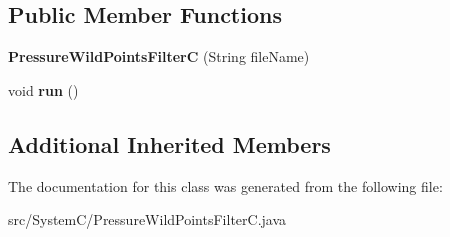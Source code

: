 \subsection*{Public Member Functions}
\begin{DoxyCompactItemize}
\item 
\hypertarget{class_system_c_1_1_pressure_wild_points_filter_c_a62e1a799ab11aec6e583eb190148ab68}{}{\bfseries Pressure\+Wild\+Points\+Filter\+C} (String file\+Name)\label{class_system_c_1_1_pressure_wild_points_filter_c_a62e1a799ab11aec6e583eb190148ab68}

\item 
\hypertarget{class_system_c_1_1_pressure_wild_points_filter_c_ab7d68f658fb1b75245d9a391a26d8475}{}void {\bfseries run} ()\label{class_system_c_1_1_pressure_wild_points_filter_c_ab7d68f658fb1b75245d9a391a26d8475}

\end{DoxyCompactItemize}
\subsection*{Additional Inherited Members}


The documentation for this class was generated from the following file\+:\begin{DoxyCompactItemize}
\item 
src/\+System\+C/Pressure\+Wild\+Points\+Filter\+C.\+java\end{DoxyCompactItemize}
